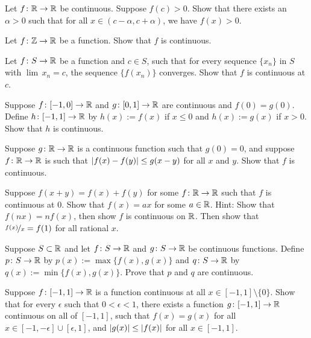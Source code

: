 \begin{exercise} \label{exercise:positivecontneigh}
Let $f \colon {\mathbb{R}} \to {\mathbb{R}}$ be continuous.  Suppose $f(c) > 0$.  Show that
there exists an $\alpha > 0$ such that for all $x \in (c-\alpha,c+\alpha)$,
we have $f(x) > 0$.
\end{exercise}

\begin{exercise}
Let $f \colon {\mathbb{Z}} \to {\mathbb{R}}$ be a function.  Show that $f$ is continuous.
\end{exercise}

\begin{exercise} \label{exercise:contseqalt}
Let $f \colon S \to {\mathbb{R}}$ be a function and $c \in S$, such that for every
sequence $\{ x_n \}$ in $S$ with $\lim\, x_n = c$, the sequence
$\{ f(x_n) \}$ converges.  Show that $f$ is continuous at $c$.
\end{exercise}

\begin{exercise}
Suppose $f \colon [-1,0] \to {\mathbb{R}}$ and $g \colon [0,1] \to {\mathbb{R}}$ are continuous
and $f(0) = g(0)$.  Define $h \colon [-1,1] \to {\mathbb{R}}$ by 
$h(x) := f(x)$ if $x \leq 0$ and $h(x) := g(x)$ if $x > 0$.  Show that
$h$ is continuous.
\end{exercise}

\begin{exercise}
Suppose $g \colon {\mathbb{R}} \to {\mathbb{R}}$ is a continuous function such that $g(0) = 0$,
and suppose $f \colon {\mathbb{R}} \to {\mathbb{R}}$ is such that
$\left\lvert {f(x)-f(y)} \right\rvert \leq g(x-y)$ for all $x$ and $y$.  Show that $f$ is
continuous.
\end{exercise}

\begin{exercise}[Challenging]
Suppose $f(x+y) = f(x) + f(y)$ for some $f \colon {\mathbb{R}} \to {\mathbb{R}}$
such that $f$ is continuous at 0.
Show that $f(x) = ax$ for some $a \in {\mathbb{R}}$.
Hint: Show that $f(nx) = nf(x)$, then show $f$ is continuous on ${\mathbb{R}}$.
Then show that $\nicefrac{f(x)}{x} = f(1)$ for all rational $x$.
\end{exercise}

\begin{exercise} \label{exercise:minmaxcont}
Suppose $S \subset {\mathbb{R}}$ and
let $f \colon S \to {\mathbb{R}}$ and
$g \colon S \to {\mathbb{R}}$ be continuous functions.
Define $p \colon S \to {\mathbb{R}}$ by
$p(x) := \max \{ f(x) , g(x) \}$ and
$q \colon S \to {\mathbb{R}}$ by
$q(x) := \min \{ f(x) , g(x) \}$.  Prove that $p$ and $q$ are
continuous.
\end{exercise}

\begin{exercise}
Suppose $f \colon [-1,1] \to {\mathbb{R}}$ is a function continuous at all $x \in
[-1,1] \setminus \{ 0 \}$.  Show that for every $\epsilon$ such
that $0 < \epsilon < 1$, there exists
a function $g \colon [-1,1] \to {\mathbb{R}}$ continuous on all of $[-1,1]$, such that
$f(x) = g(x)$ for all $x \in [-1,-\epsilon] \cup [\epsilon,1]$, and 
$\left\lvert {g(x)} \right\rvert \leq \left\lvert {f(x)} \right\rvert$ for all $x \in [-1,1]$.
\end{exercise}

